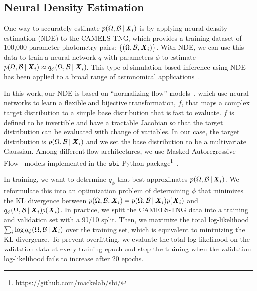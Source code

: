 \subsection{Neural Density Estimation} \label{sec:anpe}
One way to accurately estimate $p(\Omega, \mathcal{B}\,|\, {\textbf{\textit{X}}_i})$ is
by applying neural density estimation (NDE) to the CAMELS-TNG, which provides a
training dataset of 100,000 parameter-photometry pairs: 
$\{(\Omega, \mathcal{B}, {\textbf{\textit{X}}_i})\}$.
With NDE, we can use this data to train a neural network $q$ with parameters
$\phi$ to estimate 
$p(\Omega, \mathcal{B}\,|\, {\textbf{\textit{X}}_i}) \approx
q_\phi(\Omega, \mathcal{B}\,|\, {\textbf{\textit{X}}_i})$.
This type of simulation-based inference using NDE has been applied to a broad
range of astronomical applications~\citep[\eg~][]{wong2020, dax2021, zhang2021,
hahn2022d}. 

In this work, our NDE is based on ``normalizing flow'' models~\citep{tabak2010,
tabak2013}, which use neural networks to learn a flexible and bijective
transformation, $f$, that maps a complex target distribution to a simple base
distribution that is fast to evaluate.
$f$ is defined to be invertible and have a tractable Jacobian so that the 
target distribution can be evaluated with change of variables. 
In our case, the target distribution is 
$p(\Omega, \mathcal{B}\,|\, {\textbf{\textit{X}}_i})$ and we set the base distribution to
be a multivariate Gaussian. 
Among different flow architectures, we use Masked Autoregressive
Flow~\citep[MAF;][]{papamakarios2017} models implemented in the $\mathtt{sbi}$
Python
package\footnote{\url{https://github.com/mackelab/sbi/}}~\citep{greenberg2019,
tejero-cantero2020}.

In training, we want to determine $q_\phi$ that best approximates 
$p(\Omega, \mathcal{B}\,|\, {\textbf{\textit{X}}_i})$. 
We reformulate this into an optimization problem of determining $\phi$
that minimizes the KL divergence between 
$p(\Omega, \mathcal{B}, {\textbf{\textit{X}}_i}) = p(\Omega, \mathcal{B}\,|\, {\textbf{\textit{X}}_i})
 p({\textbf{\textit{X}}_i})$ and
$q_\phi(\Omega, \mathcal{B}\,|\, {\textbf{\textit{X}}_i}) p({\textbf{\textit{X}}_i})$.
In practice, we split the CAMELS-TNG data into a training and validation set
with a 90/10 split.  
Then, we maximize the total log-likelihood 
$\sum_i \log q_{\phi}(\Omega, \mathcal{B}\,|\, {\textbf{\textit{X}}_i})$ over the 
training set, which is equivalent to minimizing the KL divergence. 
To prevent overfitting, we evaluate the total log-likelihood on the validation
data at every training epoch and stop the training when the validation 
log-likelihood fails to increase after 20 epochs.  

